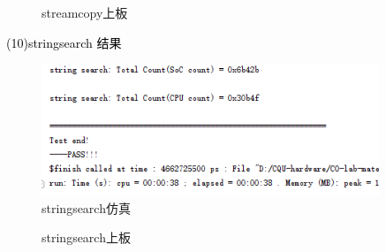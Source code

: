 \begin{figure}[htbp]
    \centering
    \caption{streamcopy上板}
\end{figure}

\newpage
\textcolor{black}{(10)stringsearch 结果}\\
\begin{figure}[htbp]
    \centering
    \includegraphics[width=0.9\textwidth]{image/stringsearchS.png}
    \caption{stringsearch仿真}
\end{figure}

\begin{figure}[htbp]
    \centering
    \caption{stringsearch上板}
\end{figure}

